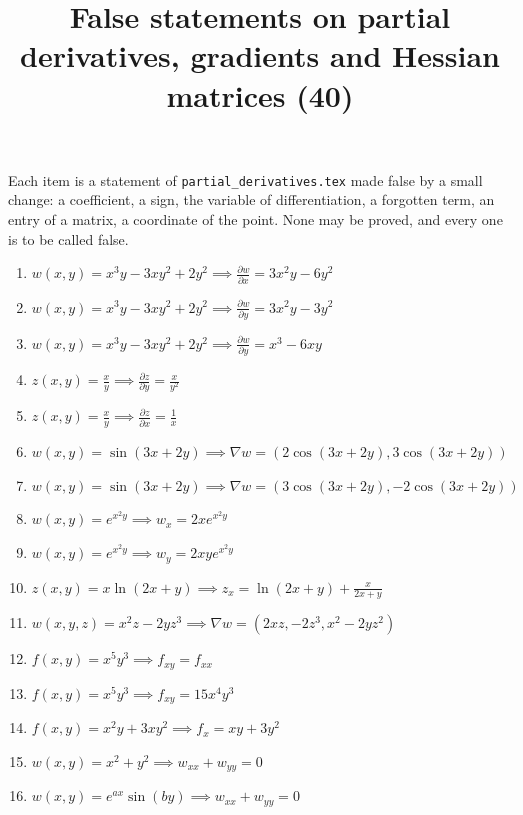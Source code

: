 \documentclass[11pt,a4paper]{article}
\title{False statements on partial derivatives, gradients and Hessian matrices (40)}
\author{}
\date{}
\begin{document}
\maketitle
Each item is a statement of \texttt{partial\_derivatives.tex} made false by a small change: a coefficient, a sign, the variable of differentiation, a forgotten term, an entry of a matrix, a coordinate of the point. None may be proved, and every one is to be called false.

\begin{enumerate}
\item $\displaystyle w(x, y) = x^{3} y - 3xy^{2} + 2y^{2} \implies \frac{\partial w}{\partial x} = 3x^{2} y - 6y^{2}$
\item $\displaystyle w(x, y) = x^{3} y - 3xy^{2} + 2y^{2} \implies \frac{\partial w}{\partial y} = 3x^{2} y - 3y^{2}$
\item $\displaystyle w(x, y) = x^{3} y - 3xy^{2} + 2y^{2} \implies \frac{\partial w}{\partial y} = x^{3} - 6xy$
\item $\displaystyle z(x, y) = \frac{x}{y} \implies \frac{\partial z}{\partial y} = \frac{x}{y^{2}}$
\item $\displaystyle z(x, y) = \frac{x}{y} \implies \frac{\partial z}{\partial x} = \frac{1}{x}$
\item $\displaystyle w(x, y) = \sin(3x + 2y) \implies \nabla w = \left( 2\cos(3x + 2y), 3\cos(3x + 2y) \right)$
\item $\displaystyle w(x, y) = \sin(3x + 2y) \implies \nabla w = \left( 3\cos(3x + 2y), -2\cos(3x + 2y) \right)$
\item $\displaystyle w(x, y) = e^{x^{2} y} \implies w_{x} = 2x e^{x^{2} y}$
\item $\displaystyle w(x, y) = e^{x^{2} y} \implies w_{y} = 2xy e^{x^{2} y}$
\item $\displaystyle z(x, y) = x \ln(2x + y) \implies z_{x} = \ln(2x + y) + \frac{x}{2x + y}$
\item $\displaystyle w(x, y, z) = x^{2} z - 2yz^{3} \implies \nabla w = \left( 2xz, -2z^{3}, x^{2} - 2yz^{2} \right)$
\item $\displaystyle f(x, y) = x^{5} y^{3} \implies f_{xy} = f_{xx}$
\item $\displaystyle f(x, y) = x^{5} y^{3} \implies f_{xy} = 15x^{4} y^{3}$
\item $\displaystyle f(x, y) = x^{2} y + 3xy^{2} \implies f_{x} = xy + 3y^{2}$
\item $\displaystyle w(x, y) = x^{2} + y^{2} \implies w_{xx} + w_{yy} = 0$
\item $\displaystyle w(x, y) = e^{ax} \sin(by) \implies w_{xx} + w_{yy} = 0$

\end{enumerate}
\end{document}
